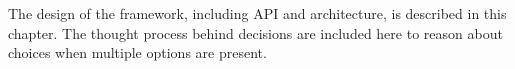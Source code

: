 The design of the framework, including API and architecture, is described in this chapter. The thought process behind decisions are included here to reason about choices when multiple options are present.

%
%
%

